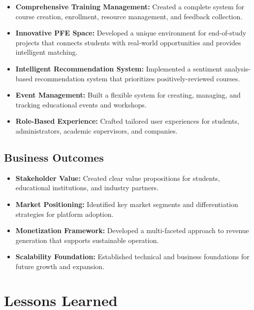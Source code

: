 \documentclass[12pt,a4paper]{report}
\begin{document}
\begin{itemize}
    \item \textbf{Comprehensive Training Management:} Created a complete system for course creation, enrollment, resource management, and feedback collection.

    \item \textbf{Innovative PFE Space:} Developed a unique environment for end-of-study projects that connects students with real-world opportunities and provides intelligent matching.

    \item \textbf{Intelligent Recommendation System:} Implemented a sentiment analysis-based recommendation system that prioritizes positively-reviewed courses.

    \item \textbf{Event Management:} Built a flexible system for creating, managing, and tracking educational events and workshops.

    \item \textbf{Role-Based Experience:} Crafted tailored user experiences for students, administrators, academic supervisors, and companies.
\end{itemize}

\subsection{Business Outcomes}

\begin{itemize}
    \item \textbf{Stakeholder Value:} Created clear value propositions for students, educational institutions, and industry partners.

    \item \textbf{Market Positioning:} Identified key market segments and differentiation strategies for platform adoption.

    \item \textbf{Monetization Framework:} Developed a multi-faceted approach to revenue generation that supports sustainable operation.

    \item \textbf{Scalability Foundation:} Established technical and business foundations for future growth and expansion.
\end{itemize}

\section{Lessons Learned}
\end{document}
